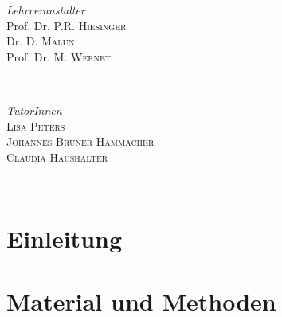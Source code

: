 \documentclass[11pt]{article}
\begin{document}
\begin{titlepage}
	\begin{minipage}{0.45\textwidth}
		\begin{flushleft}
			\large
			\textit{Lehrveranstalter}\\
			Prof. Dr. P.R. \textsc{Hiesinger}\\ 
			Dr. D. \textsc{Malun}\\ 
			Prof. Dr. M. \textsc{Wernet}
		\end{flushleft}
	\end{minipage}
	~
		\begin{minipage}{0.45\textwidth}
		\begin{flushright}
			
		\end{flushright}
	\end{minipage}
\vfill
	\begin{minipage}{0.7\textwidth}
		\begin{flushleft}
			\large
			\textit{TutorInnen}\\
			\textsc{Lisa Peters}\\
			\textsc{Johannes Brüner Hammacher}\\
			\textsc{Claudia Haushalter}
		\end{flushleft}
	\end{minipage}
	~
		\begin{minipage}{0.2\textwidth}
		\begin{flushright}
			
		\end{flushright}
	\end{minipage}

	\vfill\vfill\vfill %

	
	\vfill %
	
\end{titlepage}

\section{Einleitung}


\section{Material und Methoden}
\end{document}
